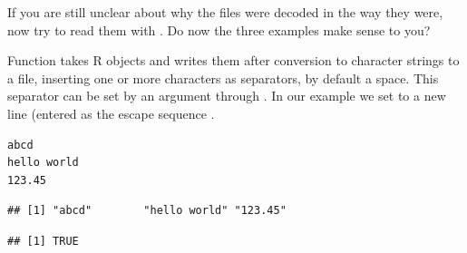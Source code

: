 \documentclass[krantz2]{krantz}\usepackage{knitr}%
\begin{document}
\begin{playground}
If you are still unclear about why the files were decoded in the way they were, now try to read them with . Do now the three examples make sense to you?
\end{playground}

Function  takes R objects and writes them after conversion to character strings to a file, inserting one or more characters as separators, by default a space. This separator can be set by an argument through . In our example we set  to a new line (entered as the escape sequence .

\begin{knitrout}\footnotesize
{}\color{fgcolor}\begin{kframe}
\begin{alltt}
 \hlkwb{<-} \hlstd{(}\hlstd{,} \hlstd{,} \hlstd{)}
  \hlstd{=} \hlstd{,}  \hlstd{=} \hlstd{)}
\hlstd{(}\hlstd{,}  \hlstd{=} \hlstd{)}
\end{alltt}
\end{kframe}
\end{knitrout}

\begin{knitrout}\footnotesize
{}\color{fgcolor}\begin{kframe}
\begin{verbatim}
abcd
hello world
123.45
\end{verbatim}
\end{kframe}
\end{knitrout}

\begin{knitrout}\footnotesize
{}\color{fgcolor}\begin{kframe}
\begin{alltt}
 \hlkwb{<-} \hlstd{(}\hlstd{)}
\end{alltt}
\begin{verbatim}
## [1] "abcd"        "hello world" "123.45"
\end{verbatim}
\begin{alltt}
  \hlstd{=} \hlstd{)}
\end{alltt}
\begin{verbatim}
## [1] TRUE
\end{verbatim}
\end{kframe}
\end{knitrout}
\end{document}
